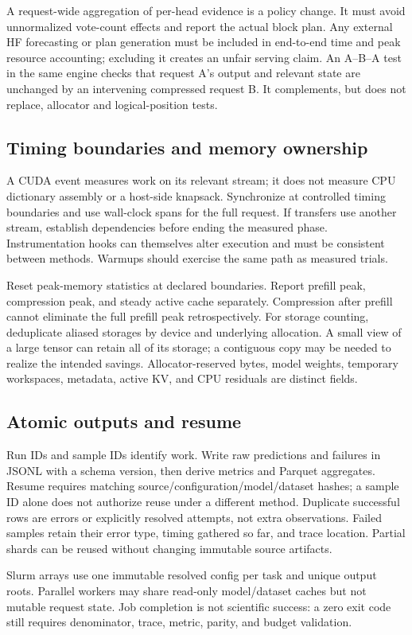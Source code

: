 A request-wide aggregation of per-head evidence is a policy change. It must
avoid unnormalized vote-count effects and report the actual block plan. Any
external HF forecasting or plan generation must be included in end-to-end time
and peak resource accounting; excluding it creates an unfair serving claim.
An A--B--A test in the same engine checks that request A's output and relevant
state are unchanged by an intervening compressed request B. It complements,
but does not replace, allocator and logical-position tests.

\subsection{Timing boundaries and memory ownership}
A CUDA event measures work on its relevant stream; it does not measure CPU
dictionary assembly or a host-side knapsack. Synchronize at controlled timing
boundaries and use wall-clock spans for the full request. If transfers use
another stream, establish dependencies before ending the measured phase.
Instrumentation hooks can themselves alter execution and must be consistent
between methods. Warmups should exercise the same path as measured trials.

Reset peak-memory statistics at declared boundaries. Report prefill peak,
compression peak, and steady active cache separately. Compression after prefill
cannot eliminate the full prefill peak retrospectively. For storage counting,
deduplicate aliased storages by device and underlying allocation. A small view
of a large tensor can retain all of its storage; a contiguous copy may be
needed to realize the intended savings. Allocator-reserved bytes, model weights,
temporary workspaces, metadata, active KV, and CPU residuals are distinct fields.

\subsection{Atomic outputs and resume}
Run IDs and sample IDs identify work. Write raw predictions and failures in
JSONL with a schema version, then derive metrics and Parquet aggregates. Resume
requires matching source/configuration/model/dataset hashes; a sample ID alone
does not authorize reuse under a different method. Duplicate successful rows
are errors or explicitly resolved attempts, not extra observations. Failed
samples retain their error type, timing gathered so far, and trace location.
Partial shards can be reused without changing immutable source artifacts.

Slurm arrays use one immutable resolved config per task and unique output roots.
Parallel workers may share read-only model/dataset caches but not mutable
request state. Job completion is not scientific success: a zero exit code
still requires denominator, trace, metric, parity, and budget validation.
